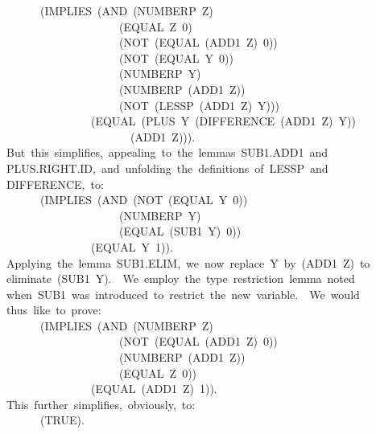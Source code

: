 \documentclass[11pt]{book}
\newenvironment{pubasis}{\begin{flushleft}\ttfamily\small}{\normalsize\rmfamily\end{flushleft}}
\begin{document}
\begin{pubasis}
~~~~~~~~~~(IMPLIES~(AND~(NUMBERP~Z)\\
~~~~~~~~~~~~~~~~~~~~~~~~(EQUAL~Z~0)\\
~~~~~~~~~~~~~~~~~~~~~~~~(NOT~(EQUAL~(ADD1~Z)~0))\\
~~~~~~~~~~~~~~~~~~~~~~~~(NOT~(EQUAL~Y~0))\\
~~~~~~~~~~~~~~~~~~~~~~~~(NUMBERP~Y)\\
~~~~~~~~~~~~~~~~~~~~~~~~(NUMBERP~(ADD1~Z))\\
~~~~~~~~~~~~~~~~~~~~~~~~(NOT~(LESSP~(ADD1~Z)~Y)))\\
~~~~~~~~~~~~~~~~~~~(EQUAL~(PLUS~Y~(DIFFERENCE~(ADD1~Z)~Y))\\
~~~~~~~~~~~~~~~~~~~~~~~~~~(ADD1~Z))).\\

~~~~But~this~simplifies,~appealing~to~the~lemmas~SUB1.ADD1~and\\
~~~~PLUS.RIGHT.ID,~and~unfolding~the~definitions~of~LESSP~and\\
~~~~DIFFERENCE,~to:\\

~~~~~~~~~~(IMPLIES~(AND~(NOT~(EQUAL~Y~0))\\
~~~~~~~~~~~~~~~~~~~~~~~~(NUMBERP~Y)\\
~~~~~~~~~~~~~~~~~~~~~~~~(EQUAL~(SUB1~Y)~0))\\
~~~~~~~~~~~~~~~~~~~(EQUAL~Y~1)).\\

~~~~Applying~the~lemma~SUB1.ELIM,~we~now~replace~Y~by~(ADD1~Z)~to\\
~~~~eliminate~(SUB1~Y).~~We~employ~the~type~restriction~lemma~noted\\
~~~~when~SUB1~was~introduced~to~restrict~the~new~variable.~~We~would\\
~~~~thus~like~to~prove:\\

~~~~~~~~~~(IMPLIES~(AND~(NUMBERP~Z)\\
~~~~~~~~~~~~~~~~~~~~~~~~(NOT~(EQUAL~(ADD1~Z)~0))\\
~~~~~~~~~~~~~~~~~~~~~~~~(NUMBERP~(ADD1~Z))\\
~~~~~~~~~~~~~~~~~~~~~~~~(EQUAL~Z~0))\\
~~~~~~~~~~~~~~~~~~~(EQUAL~(ADD1~Z)~1)).\\

~~~~This~further~simplifies,~obviously,~to:\\

~~~~~~~~~~(TRUE).\\


\end{pubasis}
\end{document}
